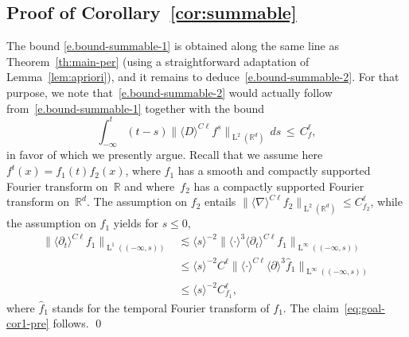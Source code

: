 \documentclass[10pt]{amsart}
\theoremstyle{plain}
\theoremstyle{definition}
\numberwithin{equation}{section}
\newcommand{\R}{\mathbb R}
\newcommand{\Ld}{\operatorname{L}}
\begin{document}
\subsection{Proof of Corollary~\ref{cor:summable}}
The bound \eqref{e.bound-summable-1} is obtained along the same line as Theorem~\ref{th:main-per} (using a straightforward adaptation of Lemma~\ref{lem:apriori}),
and it remains to deduce~\eqref{e.bound-summable-2}.
For that purpose, we note that~\eqref{e.bound-summable-2} would actually follow from~\eqref{e.bound-summable-1} together with the bound
\begin{equation}\label{eq:goal-cor1-pre}
\int_{-\infty}^t(t-s) \|\langle D\rangle^{C\ell} f^s\|_{\Ld^2(\R^d)}\,ds\, \le\, {C_f^\ell},
\end{equation}
in favor of which we presently argue.
Recall that we assume here $f^t(x)=f_1(t)f_2(x)$, where $f_1$ has a smooth and compactly supported Fourier transform on~$\R$ and where~$f_2$ has a compactly supported Fourier transform on~$\R^d$.
The assumption on $f_2$ entails $\|\langle\nabla\rangle^{C\ell} f_2\|_{\Ld^2(\R^d)} \le{C_{f_2}^\ell}$, while the assumption on $f_1$ yields for $s\le0$,
\begin{align*}
\|\langle\partial_t\rangle^{C\ell} f_1\|_{\Ld^1((-\infty,s))}&\lesssim\langle s\rangle^{-2}\|\langle\cdot\rangle^3\langle\partial_t\rangle^{C\ell} f_1\|_{\Ld^\infty((-\infty,s))}\\
&\le \langle s\rangle^{-2}C^\ell\|\langle\cdot\rangle^{C\ell}\langle\partial\rangle^3\hat f_1\|_{\Ld^\infty((-\infty,s))}\\
&\le \langle s\rangle^{-2}{C_{f_1}^\ell},
\end{align*}
where $\hat f_1$ stands for the temporal Fourier transform of $f_1$.
The claim~\eqref{eq:goal-cor1-pre} follows.
\qed
\end{document}
